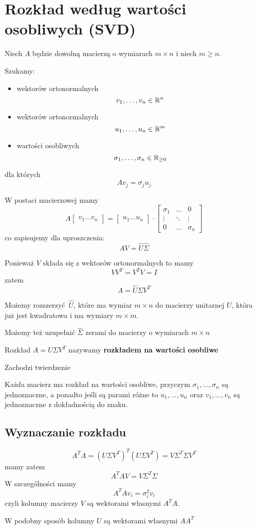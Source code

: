 \section{Rozkład według wartości osobliwych (SVD)}

Niech \( A \) będzie dowolną macierzą o wymiarach \( m \times n \) i niech \( m \geq n \).

Szukamy:
\begin{itemize}
	\item wektorów ortonormalnych
	      \[
		      v_1, \dots, v_n \in \mathbb{R}^n
	      \]

	\item wektorów ortonormalnych
	      \[
		      u_1, \dots, u_n \in \mathbb{R}^m
	      \]

	\item wartości osobliwych
	      \[
		      \sigma_1, \dots, \sigma_n \in \mathbb{R}_{\geq 0}
	      \]
\end{itemize}
dla których
\[
	Av_j = \sigma_j u_j
\]

W postaci macierzowej mamy
\[
	A \begin{bmatrix}
		v_1 \dots v_n
	\end{bmatrix}
	=\begin{bmatrix}
		u_1 \dots u_n
	\end{bmatrix}
	\cdot
	\begin{bmatrix}
		\sigma_1 & \hdots & 0        \\
		\vdots   & \ddots & \vdots   \\
		0        & \hdots & \sigma_n
	\end{bmatrix}
\]
co zapisujemy dla uproszczenia:
\[
	AV = \widehat U \widehat \Sigma
\]

Ponieważ \( V \) składa się z wektorów ortonormalnych to mamy
\[ VV^T = V^TV = I \]
zatem
\[ A = \widehat U \widehat \Sigma V^T\]

Możemy rozszerzyć \( \widehat U \), które ma wymiar \( m \times n \) do macierzy unitarnej \( U \), która już jest kwadratowa i ma wymiary \( m \times m \).

Możemy też uzupełnić \( \widehat \Sigma \) zerami do macierzy o wymiarach \( m \times n \)

Rozkład \( A = U\Sigma V^T \) nazywamy \textbf{rozkładem na wartości osobliwe}

Zachodzi twierdzenie
\begin{theorem}
	Każda macierz ma rozkład na wartości osobliwe, przyczym \( \sigma_1, \dots, \sigma_n \) są jednoznaczne, a ponadto jeśli są parami różne to \( u_1, \dots, u_n \) oraz \(v_1, \dots, v_n\) są jednoznaczne z dokładnością do znaku.
\end{theorem}

\subsection{Wyznaczanie rozkładu}
\[
	A^TA = (U\Sigma V^T)^T(U\Sigma V^T) = V\Sigma^T\Sigma V^T
\]
mamy zatem
\[
	A^TAV = V\Sigma^T\Sigma
\]
W szczególności mamy
\[
	A^TAv_i = \sigma^2_i v_i
\]
czyli kolumny macierzy \( V \) są wektorami własnymi \( A^TA\).

W podobny sposób kolumny \( U \) są wektorami własnymi \( AA^T \)
